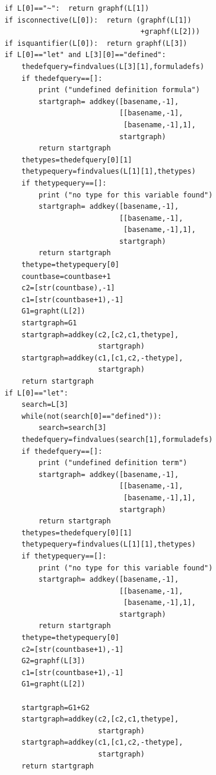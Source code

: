\documentclass{article}
\begin{document}
\begin{verbatim}
    if L[0]=="~":  return graphf(L[1])
    if isconnective(L[0]):  return (graphf(L[1])
                                    +graphf(L[2]))
    if isquantifier(L[0]):  return graphf(L[3])
    if L[0]=="let" and L[3][0]=="defined":
        thedefquery=findvalues(L[3][1],formuladefs)
        if thedefquery==[]:
            print ("undefined definition formula")
            startgraph= addkey([basename,-1],
                               [[basename,-1],
                                [basename,-1],1],
                               startgraph)
            return startgraph
        thetypes=thedefquery[0][1]
        thetypequery=findvalues(L[1][1],thetypes)
        if thetypequery==[]:
            print ("no type for this variable found")
            startgraph= addkey([basename,-1],
                               [[basename,-1],
                                [basename,-1],1],
                               startgraph)
            return startgraph
        thetype=thetypequery[0]
        countbase=countbase+1
        c2=[str(countbase),-1]
        c1=[str(countbase+1),-1]
        G1=grapht(L[2])
        startgraph=G1
        startgraph=addkey(c2,[c2,c1,thetype],
                          startgraph)
        startgraph=addkey(c1,[c1,c2,-thetype],
                          startgraph)
        return startgraph      
    if L[0]=="let":
        search=L[3]
        while(not(search[0]=="defined")):
            search=search[3]
        thedefquery=findvalues(search[1],formuladefs)
        if thedefquery==[]:
            print ("undefined definition term")
            startgraph= addkey([basename,-1],
                               [[basename,-1],
                                [basename,-1],1],
                               startgraph)
            return startgraph
        thetypes=thedefquery[0][1]
        thetypequery=findvalues(L[1][1],thetypes)
        if thetypequery==[]:
            print ("no type for this variable found")
            startgraph= addkey([basename,-1],
                               [[basename,-1],
                                [basename,-1],1],
                               startgraph)
            return startgraph
        thetype=thetypequery[0]
        c2=[str(countbase+1),-1]
        G2=graphf(L[3])
        c1=[str(countbase+1),-1]
        G1=grapht(L[2])

        startgraph=G1+G2
        startgraph=addkey(c2,[c2,c1,thetype],
                          startgraph)
        startgraph=addkey(c1,[c1,c2,-thetype],
                          startgraph)
        return startgraph        
         

\end{verbatim}
\end{document}
